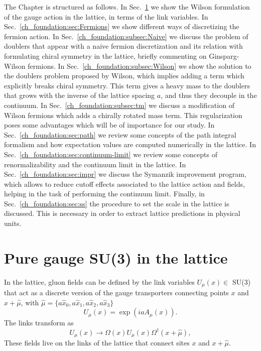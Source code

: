 The Chapter is structured as follows. In Sec.~\ref{ch_foundation:sec:Gauge} we show the Wilson formulation of the gauge action in the lattice, in terms of the link variables. In Sec.~\ref{ch_foundation:sec:Fermions} we show different ways of discretizing the fermion action. In Sec.~\ref{ch_foundation:subsec:Naive} we discuss the problem of doublers that appear with a naive fermion discretization and its relation with formulating chiral symmetry in the lattice, briefly commenting on Ginsparg-Wilson fermions. In Sec.~\ref{ch_foundation:subsec:Wilson} we show the solution to the doublers problem proposed by Wilson, which implies adding a term which explicitly breaks chiral symmetry. This term gives a heavy mass to the doublers that grows with the inverse of the lattice spacing $a$, and thus they decouple in the continuum. In Sec.~\ref{ch_foundation:subsec:tm} we discuss a modification of Wilson fermions which adds a chirally rotated mass term. This regularization poses some advantages which will be of importance for our study. In Sec.~\ref{ch_foundation:sec:path} we review some concepts of the path integral formalism and how expectation values are computed numerically in the lattice. In Sec.~\ref{ch_foundation:sec:continuum-limit} we review some concepts of renormalizability and the continuum limit in the lattice. In Sec.~\ref{ch_foundation:sec:impr} we discuss the Symanzik improvement program, which allows to reduce cutoff effects associated to the lattice action and fields, helping in the task of performing the continuum limit. Finally, in Sec.~\ref{ch_foundation:sec:ss} the procedure to set the scale in the lattice is discussed. This is necessary in order to extract lattice predictions in physical units.


\section{Pure gauge SU(3) in the lattice}
\label{ch_foundation:sec:Gauge}

In the lattice, gluon fields can be defined by the link variables $U_{\mu}(x)\in$ SU(3) that act as a discrete version of the gauge transporters connecting points $x$ and $x+\hat{\mu}$, with $\hat{\mu}=\{a\hat{x}_0,a\hat{x}_1,a\hat{x}_2,a\hat{x}_3\}$
\begin{equation}
\label{ch_foundation:eq:U}
U_{\mu}(x)=\exp\left(iaA_{\mu}(x)\right).
\end{equation}
The links transform as 
\begin{equation}
\label{ch_foundation:eq:U_transf}
U_{\mu}(x)\to\Omega(x)U_{\mu}(x)\Omega^{\dagger}(x+\hat{\mu}),
\end{equation}
These fields live on the links of the lattice that connect sites $x$ and $x+\hat{\mu}$.

